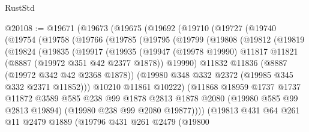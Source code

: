 \begin{lexlean}{RustStd}
\begin{coremodule}
@20108 := @19671
    (@19673
      (@19675
        (@19692
          (@19710
            (@19727
              (@19740
                (@19754
                  (@19758
                    (@19766
                      (@19785
                        (@19795
                          (@19799
                            (@19808
                              (@19812
                                (@19819
                                  (@19824
                                    (@19835
                                      (@19917
                                        (@19935
                                          (@19947
                                            (@19978 @19990)
                                            @11817
                                            @11821
                                            (@8887 (@19972 @351 @42 @2377 @1878))
                                            @19990)
                                          @11832
                                          @11836
                                          (@8887 (@19972 @342 @42 @2368 @1878))
                                          (@19980 @348 @332 @2372 (@19985 @345 @332 @2371 @11852)))
                                        @10210
                                        @11861
                                        @10222)
                                      (@11868
                                        @18959
                                        @1737
                                        @1737
                                        @11872
                                        @3589
                                        @585
                                        @238
                                        @99
                                        @1878
                                        @2813
                                        @1878
                                        @2080
                                        (@19980 @585 @99 @2813 @19894)
                                        (@19980 @238 @99 @2080 @19877))))
                                  (@19813
                                    @431
                                    @64
                                    @261
                                    @11
                                    @2479
                                    @1889
                                    (@19796
                                      @431
                                      @261
                                      @2479
                                      (@19800

\end{coremodule}
\end{lexlean}
